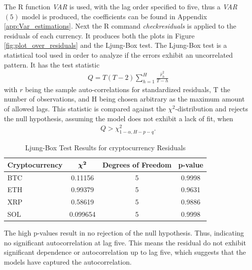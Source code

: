 \noindent The R function \textit{VAR} is used, with the lag order specified to five, thus a \textit{VAR}$(5)$ model is produced, the coefficients can be found in Appendix \ref{app:Var_estimations}. Next the R command \textit{checkresiduals} is applied to the residuals of each currency. It produces both the plots in Figure \ref{fig:plot_over_residuals} and the Ljung-Box test. The Ljung-Box test is a statistical tool used in order to analyze if the errors exhibit an uncorrelated pattern. It has the test statistic 
\begin{align*}
    Q=T(T-2)\sum^H_{h=1}\frac{\hat{r}^2_{h}}{T-h}
\end{align*}
with $r$ being the sample auto-correlations for standardized residuals, T the number of observations, and H being chosen arbitrary as the maximum amount of allowed lags. This statistic is compared against the $\chi^2$-distribution and rejects the null hypothesis,  assuming the model does not exhibit a lack of fit, when
\begin{align*}
    Q>\chi^2_{1-\alpha,H-p-q}.
\end{align*}
\begin{table}[H]
\centering
\begin{tabular}{|l|c|c|c|}
\hline
\textbf{Cryptocurrency} & $\boldsymbol{\chi^2}$ & \textbf{Degrees of Freedom} & \textbf{p-value} \\
\hline
BTC & 0.11156 & 5 & 0.9998 \\
ETH & 0.99379 & 5 & 0.9631 \\
XRP & 0.58619 & 5 & 0.9886 \\
SOL & 0.099654 & 5 & 0.9998 \\
\hline
\end{tabular}
\caption{Ljung-Box Test Results for cryptocurrency Residuals}
\label{tab:ljung_box}
\end{table}
\noindent The high p-values result in no rejection of the null hypothesis. Thus, indicating no significant autocorrelation at lag five. This means the residual do not exhibit significant dependence or autocorrelation up to lag five, which suggests that the models have captured the autocorrelation.
